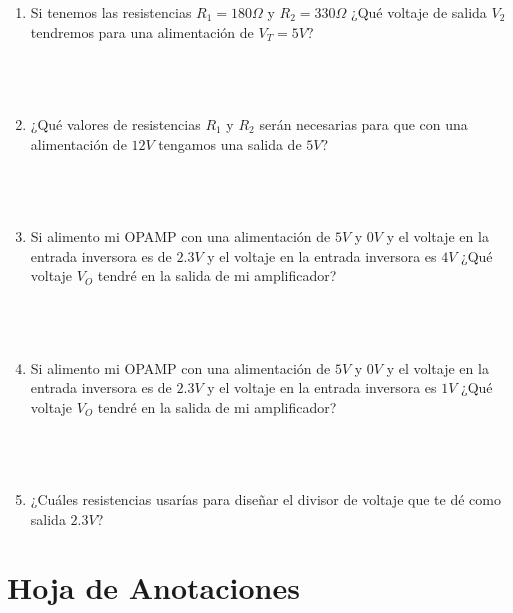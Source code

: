 	\begin{enumerate}
		\item Si tenemos las resistencias $R_1 = 180 \Omega$ y $R_2 = 330 \Omega$ ¿Qué voltaje de salida $V_2$ tendremos para una alimentación de $V_T = 5 V$?\\ \\ \\ \\
		\item ¿Qué valores de resistencias $R_1$ y $R_2$ serán necesarias para que con una alimentación de $12 V$ tengamos una salida de $5 V$?\\ \\ \\ \\
		\item Si alimento mi OPAMP con una alimentación de $5 V$ y $0V$ y el voltaje en la entrada inversora es de $2.3 V$ y el voltaje en la entrada inversora es $4 V$ ¿Qué voltaje $V_O$ tendré en la salida de mi amplificador?\\ \\ \\ \\
		\item Si alimento mi OPAMP con una alimentación de $5 V$ y $0V$ y el voltaje en la entrada inversora es de $2.3 V$ y el voltaje en la entrada inversora es $1 V$ ¿Qué voltaje $V_O$ tendré en la salida de mi amplificador?\\ \\ \\ \\
		\item ¿Cuáles resistencias usarías para diseñar el divisor de voltaje que te dé como salida $2.3 V$?\\
	\end{enumerate}


\clearpage
\section{Hoja de Anotaciones}

